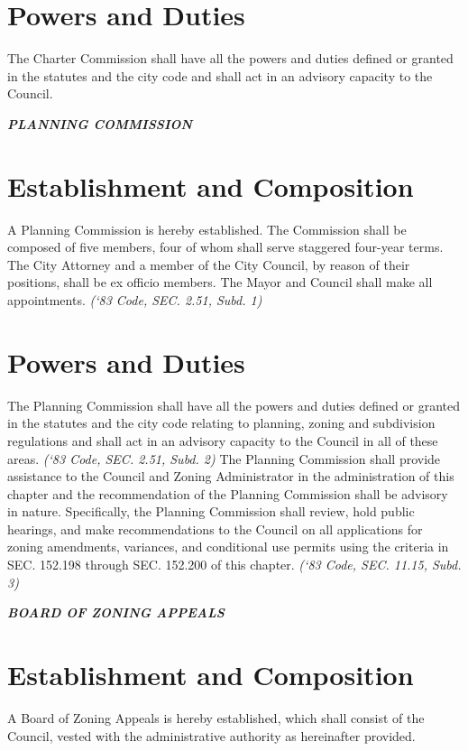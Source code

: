 \section{Powers and Duties}
The Charter Commission shall have all the powers and duties defined or granted in the statutes and the city code and shall act in an advisory capacity to the Council.\newline

\centerline{\textbf{\emph{\LARGE{PLANNING COMMISSION}}}}
\setcounter{section}{119}
\section{Establishment and Composition}
A Planning Commission is hereby established.  The Commission shall be composed of five members, four of whom shall serve staggered four-year terms.  The City Attorney and a member of the City Council, by reason of their positions, shall be ex officio members.  The Mayor and Council shall make all appointments.\newline
\emph{(‘83 Code, SEC. 2.51, Subd. 1)}
\section{Powers and Duties}
The Planning Commission shall have all the powers and duties defined or granted in the statutes and the city code relating to planning, zoning and subdivision regulations and shall act in an advisory capacity to the Council in all of these areas.\newline
\emph{(‘83 Code, SEC. 2.51, Subd. 2)}\newline
The Planning Commission shall provide assistance to the Council and Zoning Administrator in the administration of this chapter and the recommendation of the Planning Commission shall be advisory in nature. Specifically, the Planning Commission shall review, hold public hearings, and make recommendations to the Council on all applications for zoning amendments, variances, and conditional use permits using the criteria in SEC. 152.198 through SEC. 152.200 of this chapter.\newline
\emph{(‘83 Code, SEC. 11.15, Subd. 3)}\newline

\centerline{\textbf{\emph{\LARGE{BOARD OF ZONING APPEALS}}}}
\setcounter{section}{129}
\section{Establishment and Composition}
A Board of Zoning Appeals is hereby established, which shall consist of the Council, vested with the administrative authority as hereinafter provided.
